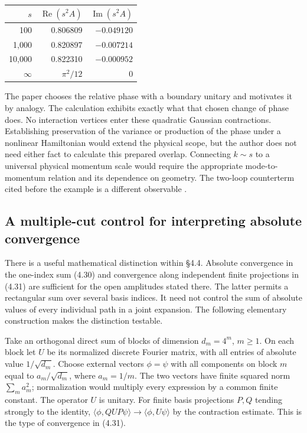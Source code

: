 \documentclass[11pt]{article}
\begin{document}
\begin{center}\small
\begin{tabular}{rrr}\toprule
$s$ & $\operatorname{Re}(s^2A)$ & $\operatorname{Im}(s^2A)$\\\midrule
100 & 0.806809 & $-0.049120$\\
1,000 & 0.820897 & $-0.007214$\\
10,000 & 0.822310 & $-0.000952$\\
$\infty$ & $\pi^2/12$ & 0\\\bottomrule
\end{tabular}
\end{center}
The paper chooses the relative phase with a boundary unitary and motivates it by analogy. The calculation exhibits exactly what that chosen change of phase does. No interaction vertices enter these quadratic Gaussian contractions. Establishing preservation of the variance or production of the phase under a nonlinear Hamiltonian would extend the physical scope, but the author does not need either fact to calculate this prepared overlap. Connecting $k\sim s$ to a universal physical momentum scale would require the appropriate mode-to-momentum relation and its dependence on geometry. The two-loop counterterm cited before the example is a different observable \cite{gs}.

\subsection{A multiple-cut control for interpreting absolute convergence}
There is a useful mathematical distinction within \S4.4. Absolute convergence in the one-index sum (4.30) and convergence along independent finite projections in (4.31) are sufficient for the open amplitudes stated there. The latter permits a rectangular sum over several basis indices. It need not control the sum of absolute values of every individual path in a joint expansion. The following elementary construction makes the distinction testable.

Take an orthogonal direct sum of blocks of dimension $d_m=4^m$, $m\ge1$. On each block let $U$ be its normalized discrete Fourier matrix, with all entries of absolute value $1/\sqrt{d_m}$. Choose external vectors $\phi=\psi$ with all components on block $m$ equal to $a_m/\sqrt{d_m}$, where $a_m=1/m$. The two vectors have finite squared norm $\sum_m a_m^2$; normalization would multiply every expression by a common finite constant. The operator $U$ is unitary. For finite basis projections $P,Q$ tending strongly to the identity, $\langle\phi,QUP\psi\rangle\to\langle\phi,U\psi\rangle$ by the contraction estimate. This is the type of convergence in (4.31).
\end{document}
